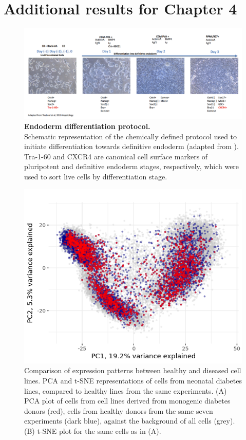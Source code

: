 \clearpage

\section{Additional results for Chapter 4}

\begin{figure}[h]
    \centering
    \includegraphics[width=16cm]{Appendix2/Fig/suppl_protocol.png}
    \caption[Endoderm differentiation protocol]{\textbf{Endoderm differentiation protocol.}\\
    Schematic representation of the chemically defined protocol used to initiate differentiation towards  definitive endoderm (adapted from \cite{touboul2010generation}). 
    Tra-1-60 and CXCR4 are canonical cell surface markers of pluripotent and definitive endoderm stages, respectively, which were used to sort live cells by differentiation stage. }
    \label{suppl_fig:endodiff_exp_protocol}
\end{figure}

\begin{figure}[h]
    \centering
    \includegraphics[width=15cm]{Appendix2/Fig/suppl_diabetes_lines.png}
    \caption[PCA of healthy and diseased cell lines]{Comparison of expression patterns between healthy and diseased cell lines.
    PCA and t-SNE representations of cells from neonatal diabetes lines, compared to healthy lines from the same experiments. 
    (A) PCA plot of cells from cell lines derived from monogenic diabetes donors (red), cells from healthy donors from the same seven experiments (dark blue), against the background of all cells (grey). 
    (B) t-SNE plot for the same cells as in (A).}
    \label{suppl_fig:pca_diabetes_lines}
\end{figure}

